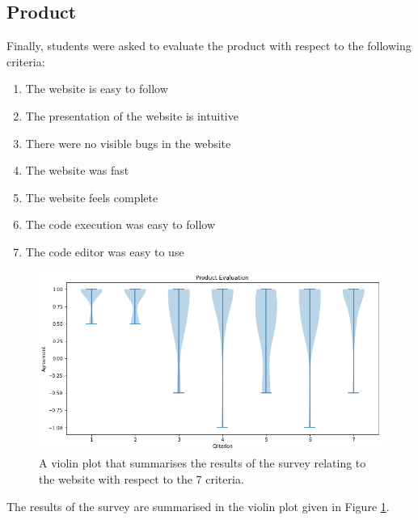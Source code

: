 \begin{appendices}
\subsection{Product}
Finally, students were asked to evaluate the product with respect to the following criteria:
\begin{enumerate}
    \item The website is easy to follow
    \item The presentation of the website is intuitive
    \item There were no visible bugs in the website
    \item The website was fast
    \item The website feels complete
    \item The code execution was easy to follow
    \item The code editor was easy to use
\end{enumerate}
 \begin{figure}[htb]
    \centering
    \includegraphics[scale=0.35]{images/website-evaluation.png}
    \caption{A violin plot that summarises the results of the survey relating to the website with respect to the 7 criteria.}
    \label{fig:website-evaluation}
\end{figure}
The results of the survey are summarised in the violin plot given in Figure \ref{fig:website-evaluation}. 



\end{appendices}